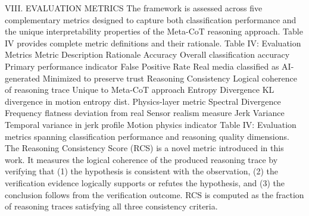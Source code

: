 VIII.  EVALUATION METRICS
The framework is assessed across five complementary metrics designed to capture both classification performance and the unique interpretability properties of the Meta-CoT reasoning approach. Table IV provides complete metric definitions and their rationale.
Table IV: Evaluation Metrics
Metric	Description	Rationale
Accuracy	Overall classification accuracy	Primary performance indicator
False Positive Rate	Real media classified as AI-generated	Minimized to preserve trust
Reasoning Consistency	Logical coherence of reasoning trace	Unique to Meta-CoT approach
Entropy Divergence	KL divergence in motion entropy dist.	Physics-layer metric
Spectral Divergence	Frequency flatness deviation from real	Sensor realism measure
Jerk Variance	Temporal variance in jerk profile	Motion physics indicator
Table IV: Evaluation metrics spanning classification performance and reasoning quality dimensions.
The Reasoning Consistency Score (RCS) is a novel metric introduced in this work. It measures the logical coherence of the produced reasoning trace by verifying that (1) the hypothesis is consistent with the observation, (2) the verification evidence logically supports or refutes the hypothesis, and (3) the conclusion follows from the verification outcome. RCS is computed as the fraction of reasoning traces satisfying all three consistency criteria.

